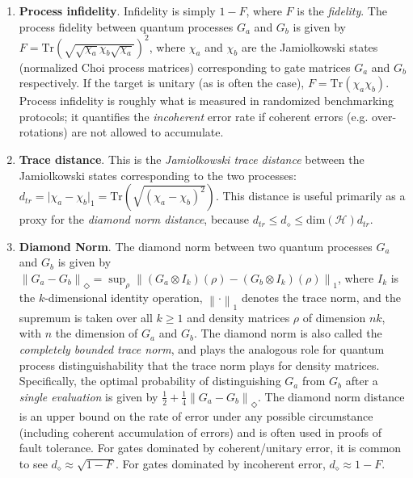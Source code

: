 \documentclass{article}[11pt]
\newcommand{\norm}[1]{\left\lVert#1\right\rVert}
\newcommand{\Tr}[0]{\mathrm{Tr}}
\begin{document}
\begin{enumerate}
\item \textbf{Process infidelity}.  Infidelity is simply $1-F$, where $F$ is the \emph{fidelity}.  The process fidelity between quantum processes $G_a$ and $G_b$ is given by $F = \Tr\left( \sqrt{ \sqrt{\chi_a} \chi_b \sqrt{\chi_a} } \right)^2$, where $\chi_a$ and $\chi_b$ are the Jamiolkowski states (normalized Choi process matrices) corresponding to gate matrices $G_a$ and $G_b$ respectively.  If the target is unitary (as is often the case), $F = \Tr\left( \chi_a \chi_b \right)$.  Process infidelity is roughly what is measured in randomized benchmarking protocols; it quantifies the \emph{incoherent} error rate if coherent errors (e.g. over-rotations) are not allowed to accumulate.
\item \textbf{Trace distance}.  This is the \emph{Jamiolkowski trace distance} between the Jamiolkowski states corresponding to the two processes:  $d_{tr} = \vert\chi_a - \chi_b\vert_1 = \Tr\left(\sqrt{(\chi_a-\chi_b)^2}\right)$.  This distance is useful primarily as a proxy for the \emph{diamond norm distance}, because $d_{tr} \leq d_{\diamond} \leq \mathrm{dim}(\mathcal{H}) d_{tr}$.
\item \textbf{Diamond Norm}.  The diamond norm between two quantum processes $G_a$ and $G_b$ is given by $\norm{G_a - G_b}_\Diamond = \sup_\rho \norm{(G_a \otimes I_k)(\rho) - (G_b \otimes I_k)(\rho)}_1$, where $I_k$ is the $k$-dimensional identity operation, $\norm{\cdot}_1$ denotes the trace norm, and the supremum is taken over all $k \ge 1$ and density matrices $\rho$ of dimension $nk$, with $n$ the dimension of $G_a$ and $G_b$.  The diamond norm is also called the \emph{completely bounded trace norm}, and plays the analogous role for quantum process distinguishability that the trace norm plays for density matrices.  Specifically, the optimal probability of distinguishing $G_a$ from $G_b$ after a \emph{single evaluation} is given by $\frac{1}{2} + \frac{1}{4}\norm{G_a - G_b}_\Diamond$.  The diamond norm distance is an upper bound on the rate of error under any possible circumstance (including coherent accumulation of errors) and is often used in proofs of fault tolerance.  For gates dominated by coherent/unitary error, it is common to see $d_{\diamond} \approx \sqrt{1-F}$.  For gates dominated by incoherent error, $d_{\diamond} \approx 1-F$.
\end{enumerate}
\end{document}
